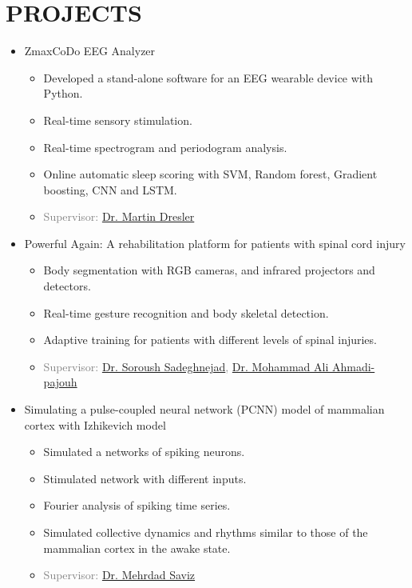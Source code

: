 \documentclass[10pt,a4paper,sans]{moderncv} %
\begin{document}
	\section{PROJECTS}
	\vspace{0.3em}
	\begin{itemize}
	
        \item ZmaxCoDo EEG Analyzer
		\begin{itemize}
            \item Developed a stand-alone software for an EEG wearable device with Python.
			\item Real-time sensory stimulation.
            \item Real-time spectrogram and periodogram analysis.
            \item Online automatic sleep scoring with SVM, Random forest, Gradient boosting, CNN and LSTM.
			\item \textcolor{gray}{Supervisor: \href{https://scholar.google.com/citations?hl=en&user=Y-hAEQYAAAAJ}{Dr. Martin Dresler}}
		\end{itemize}

        \item Powerful Again: A rehabilitation platform for patients with spinal cord injury
		\begin{itemize}
			\item Body segmentation with RGB cameras, and infrared projectors and detectors.
            \item Real-time gesture recognition and body skeletal detection.
            \item Adaptive training for patients with different levels of spinal injuries.
			\item \textcolor{gray}{Supervisor: \href{https://scholar.google.com/citations?user=snpB-kcAAAAJ&hl=en}{Dr. Soroush Sadeghnejad}, \href{https://scholar.google.com/citations?user=ictl5QcAAAAJ&hl=en}{Dr. Mohammad Ali Ahmadi-pajouh}}
		\end{itemize}

        \item Simulating a pulse-coupled neural network (PCNN) model of mammalian cortex with Izhikevich model
		\begin{itemize}
			\item Simulated a networks of spiking neurons.
            \item Stimulated network with different inputs.
            \item Fourier analysis of spiking time series.
			\item Simulated collective dynamics and rhythms similar to those of the mammalian cortex in the awake state.
			\item \textcolor{gray}{Supervisor: \href{https://ieeexplore.ieee.org/author/38272636800}{Dr. Mehrdad Saviz}}
		\end{itemize}


\end{itemize}
\end{document}
